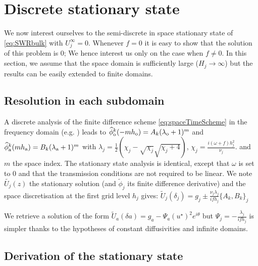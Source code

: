 \section{Discrete stationary state}
\label{sec:OASchwarz_DiscreteStationaryState}
We now interest ourselves to the semi-discrete in space
stationary state of \eqref{eq:SWRbulk} with $U_j^\infty = 0$.
Whenever $f=0$ it is easy to show that the solution of this problem
is 0;
We hence interest us only on the case when $f\neq 0$.
In this section, we assume that the space domain is sufficiently
large ($H_j \rightarrow \infty$) but the results can be easily
extended to finite domains.
\subsection{Resolution in each subdomain}
A discrete analysis of the finite difference scheme \eqref{eq:spaceTimeScheme} in the
frequency domain (e.g. \cite{wu_optimized_2017}) leads to 
$\widehat{\phi}_{\rm o}^k(-m h_{\rm o}) = A_k (\lambda_{\rm o}+1)^m$
and
$\widehat{\phi}_{\rm a}^k(m h_{\rm a}) = B_k (\lambda_{\rm a}+1)^m$ 
with $\lambda_j = \frac{1}{2}\left(\chi_j - \sqrt{\chi_j} \sqrt{\chi_j + 4}\right)$, 
$\chi_j=\frac{i (\omega+f) h_j^2}{\nu_j}$.
and $m$ the space index.
The stationary state analysis is identical, except that $\omega$ is set to 0 and that the transmission conditions are not required
to be linear. 
We note $\widetilde{U_j}(z)$ the stationary solution (and $\widetilde{\phi}_j$ its finite difference derivative) and the space discretisation at the first grid level $h_j$ gives:
$\widetilde{U}_j(\delta_j) = g_j \pm \frac{\nu_j\lambda_j}{if h_j} \{A_k, B_k\}_j$

\begin{remark}
We retrieve a solution of the form
$\widetilde{U}_a(\delta a) = g_a - \Psi_a (u^\star)^2 e^{i\theta}$
but $\Psi_j = -\frac{\lambda_j}{if h_j}$ is simpler thanks to the hypotheses of constant diffusivities and infinite domains.
\end{remark}

\subsection{Derivation of the stationary state}
